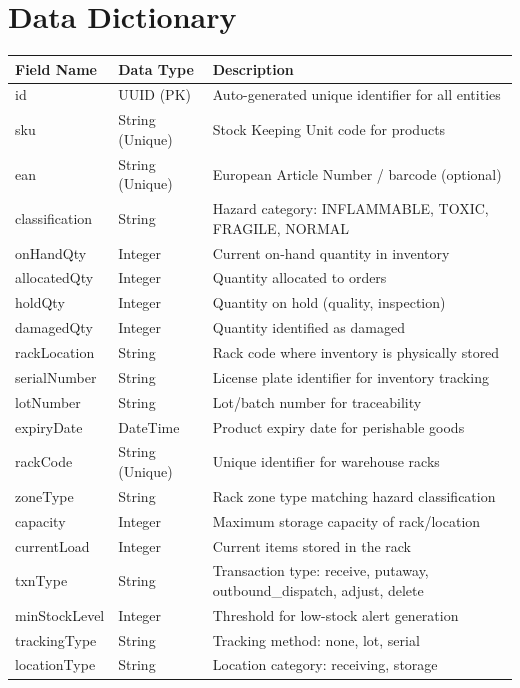 \documentclass[12pt,a4paper]{report}
\begin{document}
\section{Data Dictionary}
\begin{table}[H]
    \centering
    \renewcommand{\arraystretch}{1.3}
    \begin{tabularx}{\textwidth}{|l|l|X|}
        \hline
        \textbf{Field Name} & \textbf{Data Type} & \textbf{Description} \\
        \hline
        id & UUID (PK) & Auto-generated unique identifier for all entities \\
        \hline
        sku & String (Unique) & Stock Keeping Unit code for products \\
        \hline
        ean & String (Unique) & European Article Number / barcode (optional) \\
        \hline
        classification & String & Hazard category: INFLAMMABLE, TOXIC, FRAGILE, NORMAL \\
        \hline
        onHandQty & Integer & Current on-hand quantity in inventory \\
        \hline
        allocatedQty & Integer & Quantity allocated to orders \\
        \hline
        holdQty & Integer & Quantity on hold (quality, inspection) \\
        \hline
        damagedQty & Integer & Quantity identified as damaged \\
        \hline
        rackLocation & String & Rack code where inventory is physically stored \\
        \hline
        serialNumber & String & License plate identifier for inventory tracking \\
        \hline
        lotNumber & String & Lot/batch number for traceability \\
        \hline
        expiryDate & DateTime & Product expiry date for perishable goods \\
        \hline
        rackCode & String (Unique) & Unique identifier for warehouse racks \\
        \hline
        zoneType & String & Rack zone type matching hazard classification \\
        \hline
        capacity & Integer & Maximum storage capacity of rack/location \\
        \hline
        currentLoad & Integer & Current items stored in the rack \\
        \hline
        txnType & String & Transaction type: receive, putaway, outbound\_dispatch, adjust, delete \\
        \hline
        minStockLevel & Integer & Threshold for low-stock alert generation \\
        \hline
        trackingType & String & Tracking method: none, lot, serial \\
        \hline
        locationType & String & Location category: receiving, storage \\
        \hline
    \end{tabularx}
\end{table}
\end{document}
